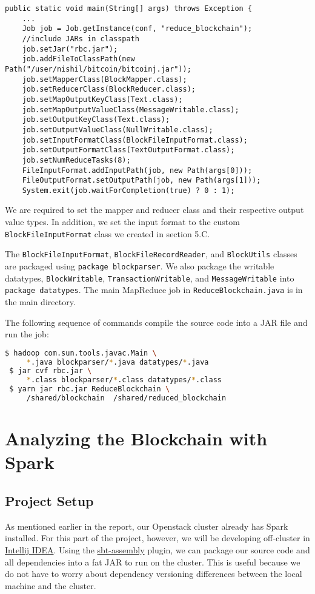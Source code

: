 \documentclass[9pt,twocolumn,twoside]{idsi}
\begin{document}
\begin{lstlisting}
public static void main(String[] args) throws Exception {
    ...
    Job job = Job.getInstance(conf, "reduce_blockchain");
    //include JARs in classpath
    job.setJar("rbc.jar");
    job.addFileToClassPath(new Path("/user/nishil/bitcoin/bitcoinj.jar"));
    job.setMapperClass(BlockMapper.class);
    job.setReducerClass(BlockReducer.class);
    job.setMapOutputKeyClass(Text.class);
    job.setMapOutputValueClass(MessageWritable.class);
    job.setOutputKeyClass(Text.class);
    job.setOutputValueClass(NullWritable.class);
    job.setInputFormatClass(BlockFileInputFormat.class);
    job.setOutputFormatClass(TextOutputFormat.class);
    job.setNumReduceTasks(8);
    FileInputFormat.addInputPath(job, new Path(args[0]));
    FileOutputFormat.setOutputPath(job, new Path(args[1]));
    System.exit(job.waitForCompletion(true) ? 0 : 1);
\end{lstlisting}

We are required to set the mapper and reducer class and their respective output value types. In addition, we set the input format to the custom \lstinline{BlockFileInputFormat} class we created in section 5.C.

The \lstinline{BlockFileInputFormat}, \lstinline{BlockFileRecordReader}, and \lstinline{BlockUtils} classes are packaged using \lstinline{package blockparser}. We also package the writable datatypes, \lstinline{BlockWritable}, \lstinline{TransactionWritable}, and \lstinline{MessageWritable} into \lstinline{package datatypes}. The main MapReduce job in \lstinline{ReduceBlockchain.java} is in the main directory.

The following sequence of commands compile the source code into a JAR file and run the job:

\begin{lstlisting}[language=bash]
 $ hadoop com.sun.tools.javac.Main \
     *.java blockparser/*.java datatypes/*.java
 $ jar cvf rbc.jar \
     *.class blockparser/*.class datatypes/*.class
 $ yarn jar rbc.jar ReduceBlockchain \
     /shared/blockchain  /shared/reduced_blockchain
\end{lstlisting}

\section{Analyzing the Blockchain with Spark}
\subsection{Project Setup}
As mentioned earlier in the report, our Openstack cluster already has Spark installed. For this part of the project, however, we will be developing off-cluster in \href{https://www.jetbrains.com/idea/}{Intellij IDEA}. Using the \href{https://github.com/sbt/sbt-assembly}{sbt-assembly} plugin, we can package our source code and all dependencies into a fat JAR to run on the cluster. This is useful because we do not have to worry about dependency versioning differences between the local machine and the cluster.
\end{document}
